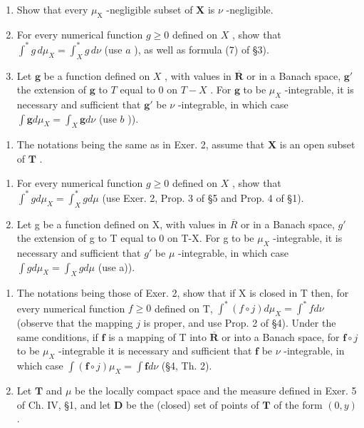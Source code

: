 \begin{enumerate}
\def\labelenumi{\alph{enumi})}
\item
  Show that every \(\mu_{\mathrm{X}}\) -negligible subset of \(\mathbf{X}\) is \(\nu\) -negligible.
\item
  For every numerical function \(g \geqslant 0\) defined on \(X\) , show that \(\int^{*} g \, d\mu_{X} = \int_{X}^{*} g \, d\nu\) (use \(a\) ), as well as formula (7) of §3).
\item
  Let \(\mathbf{g}\) be a function defined on \(X\) , with values in \(\overline{\mathbf{R}}\) or in a Banach space, \(\mathbf{g}'\) the extension of \(\mathbf{g}\) to \(T\) equal to 0 on \(T - X\) . For \(\mathbf{g}\) to be \(\mu_{X}\) -integrable, it is necessary and sufficient that \(\mathbf{g}'\) be \(\nu\) -integrable, in which case \(\int \mathbf{g} d\mu_X = \int_X \mathbf{g} d\nu\) (use \(b\) )).
\end{enumerate}

\begin{enumerate}
\def\labelenumi{\arabic{enumi})}
\setcounter{enumi}{2}
\tightlist
\item
  The notations being the same as in Exer. 2, assume that \(\mathbf{X}\) is an open subset of \(\mathbf{T}\) .
\end{enumerate}

\begin{enumerate}
\def\labelenumi{\alph{enumi})}
\item
  For every numerical function \(g \geqslant 0\) defined on \(X\) , show that \(\int^{*} g d\mu_{X} = \int_{X}^{*} g d\mu\) (use Exer. 2, Prop. 3 of §5 and Prop. 4 of §1).
\item
  Let g be a function defined on X, with values in \(\overline{R}\) or in a Banach space, \(g'\) the extension of g to T equal to 0 on T-X. For g to be \(\mu_{X}\) -integrable, it is necessary and sufficient that \(g'\) be \(\mu\) -integrable, in which case \(\int g d\mu_{X} = \int_{X} g d\mu\) (use a)).
\end{enumerate}

\begin{enumerate}
\def\labelenumi{\arabic{enumi})}
\setcounter{enumi}{3}
\item
  The notations being those of Exer. 2, show that if X is closed in T then, for every numerical function \(f \geqslant 0\) defined on T, \(\int^{*}(f \circ j) d\mu_{X} = \int^{*} f d\nu\) (observe that the mapping \(j\) is proper, and use Prop. 2 of §4). Under the same conditions, if \(\mathbf{f}\) is a mapping of T into \(\overline{\mathbf{R}}\) or into a Banach space, for \(\mathbf{f} \circ j\) to be \(\mu_{X}\) -integrable it is necessary and sufficient that \(\mathbf{f}\) be \(\nu\) -integrable, in which case \(\int(\mathbf{f} \circ j)\mu_{X} = \int \mathbf{f} d\nu\) (§4, Th. 2).
\item
  Let \(\mathbf{T}\) and \(\mu\) be the locally compact space and the measure defined in Exer. 5 of Ch. IV, §1, and let \(\mathbf{D}\) be the (closed) set of points of \(\mathbf{T}\) of the form \((0,y)\) .
\end{enumerate}

